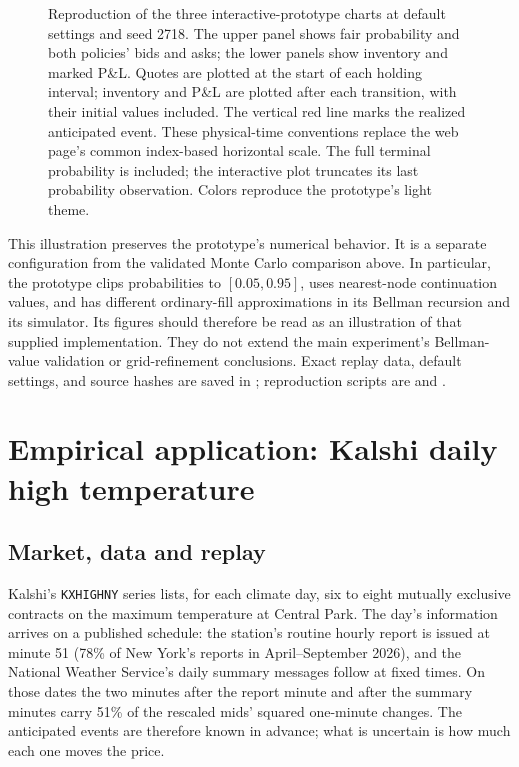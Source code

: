 \documentclass[11pt]{article}
\newcommand{\1}{\mathbf 1}
\begin{document}
\begin{figure}[p]
\caption{Reproduction of the three interactive-prototype charts at default
settings and seed 2718. The upper panel shows fair probability and both
policies' bids and asks; the lower panels show inventory and marked P\&L.
Quotes are plotted at the start of each holding interval; inventory and P\&L
are plotted after each transition, with their initial values included. The
vertical red line marks the realized anticipated event. These physical-time
conventions replace the web page's common index-based horizontal scale.
The full terminal probability is included; the interactive plot truncates its
last probability observation. Colors reproduce the prototype's light theme.}
\label{fig:prototype}
\end{figure}

This illustration preserves the prototype's numerical behavior. It is a
separate configuration from the validated Monte Carlo comparison above. In
particular, the prototype clips probabilities to $[0.05,0.95]$, uses nearest-node
continuation values, and has different ordinary-fill approximations in its
Bellman recursion and its simulator. Its figures should therefore be read as
an illustration of that supplied implementation. They do not extend the main
experiment's Bellman-value validation or grid-refinement conclusions.
Exact replay data, default settings, and source hashes are saved in
; reproduction scripts are
 and
.

\clearpage
\section{Empirical application: Kalshi daily high temperature}
\label{sec:weather}
\subsection{Market, data and replay}
Kalshi's \texttt{KXHIGHNY} series lists, for each climate day, six to eight
mutually exclusive contracts on the maximum temperature at Central Park. The
day's information arrives on a published schedule: the station's routine
hourly report is issued at minute 51 (78\% of New York's reports in April--September
2026), and the National Weather Service's daily summary messages follow at fixed
times. On those dates the two minutes after the report minute and after the
summary minutes carry 51\% of the rescaled mids' squared one-minute changes.
The anticipated events are therefore known in advance; what is uncertain is
how much each one moves the price.
\end{document}
